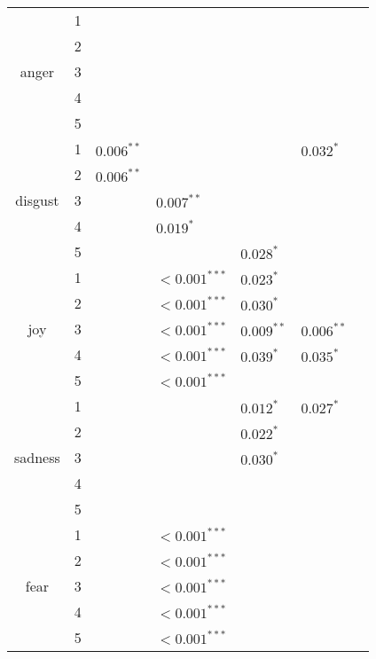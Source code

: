 \documentclass[aps,preprint,groupedaddress]{revtex4-1}
\begin{document}
\begin{table*}[!t]
\begin{tabular}{c|c|lllll}
\multirow{5}{*}{anger}    & 1             &                &               &               &              &                 \\
                          & 2             &                &               &               &              &                 \\
                          & 3             &                &               &               &              &                 \\
                          & 4             &                &               &               &              &                 \\
                          & 5             &                &               &               &              &                 \\ \hline
\multirow{5}{*}{disgust}  & 1 & $0.006^{**}$ & & & $0.032^{*}$ & \\ 
                          & 2 & $0.006^{**}$ & & & & \\
                          & 3 & & $0.007^{**}$ & & & \\
                          & 4 & & $0.019^{*}$ & & & \\
                          & 5 & & & $0.028^{*}$ & & \\ \hline
\multirow{5}{*}{joy}      & 1 & & $<0.001^{***}$ & $0.023^{*}$ & & \\ 
                          & 2 & & $<0.001^{***}$ & $0.030^{*}$ & & \\
                          & 3 & & $<0.001^{***}$ & $0.009^{**}$ & $0.006^{**}$ & \\
                          & 4 & & $<0.001^{***}$ & $0.039^{*}$ & $0.035^{*}$& \\
                          & 5 & & $<0.001^{***}$ & & & \\ \hline
\multirow{5}{*}{sadness}  & 1 & & & $0.012^{*}$ & $0.027^{*}$ & \\
                          & 2 & & & $0.022^{*}$ & & \\
                          & 3 & & & $0.030^{*}$ & & \\
                          & 4 & & & & & \\
                          & 5 & & & & & \\ \hline
\multirow{5}{*}{fear}     & 1 & & $<0.001^{***}$ & & & \\ 
                          & 2 & & $<0.001^{***}$ & & & \\
                          & 3 & & $<0.001^{***}$ & & & \\
                          & 4 & & $<0.001^{***}$ & & & \\
                          & 5 & & $<0.001^{***}$ & & & \\
\hline
\end{tabular}
\end{table*}
\end{document}
